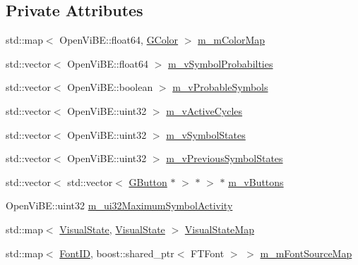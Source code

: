 \subsection*{Private Attributes}
\begin{DoxyCompactItemize}
\item 
std::map$<$ OpenViBE::float64, \hyperlink{structOpenViBEApplications_1_1GColor}{GColor} $>$ \hyperlink{classOpenViBEApplications_1_1P300KeyboardHandler_a6698e3da5de1ca1361ca0051380c70a4}{m\_\-mColorMap}
\item 
std::vector$<$ OpenViBE::float64 $>$ \hyperlink{classOpenViBEApplications_1_1P300KeyboardHandler_a1ac93ed15de2fd151ec5bfaf5e71a607}{m\_\-vSymbolProbabilties}
\item 
std::vector$<$ OpenViBE::boolean $>$ \hyperlink{classOpenViBEApplications_1_1P300KeyboardHandler_ae30854286f16b23de7c72f1549bd5596}{m\_\-vProbableSymbols}
\item 
std::vector$<$ OpenViBE::uint32 $>$ \hyperlink{classOpenViBEApplications_1_1P300KeyboardHandler_ad280c1e2d6f779b4720d8c11b7113aaf}{m\_\-vActiveCycles}
\item 
std::vector$<$ OpenViBE::uint32 $>$ \hyperlink{classOpenViBEApplications_1_1P300KeyboardHandler_a07584e22150a0ab2940cdd7a04a9dc1a}{m\_\-vSymbolStates}
\item 
std::vector$<$ OpenViBE::uint32 $>$ \hyperlink{classOpenViBEApplications_1_1P300KeyboardHandler_a3767646cdb49bf416483f9f9455769fe}{m\_\-vPreviousSymbolStates}
\item 
std::vector$<$ std::vector$<$ \hyperlink{classOpenViBEApplications_1_1GButton}{GButton} $\ast$ $>$ $\ast$ $>$ $\ast$ \hyperlink{classOpenViBEApplications_1_1P300KeyboardHandler_a66266cf621af51049274763bff5f1f15}{m\_\-vButtons}
\item 
OpenViBE::uint32 \hyperlink{classOpenViBEApplications_1_1P300KeyboardHandler_ac82daa9b67e49894444473acf01bc075}{m\_\-ui32MaximumSymbolActivity}
\item 
std::map$<$ \hyperlink{ova__defines_8h_ac2575a0c79ceb4592555fa66f173dfc8}{VisualState}, \hyperlink{ova__defines_8h_ac2575a0c79ceb4592555fa66f173dfc8}{VisualState} $>$ \hyperlink{classOpenViBEApplications_1_1P300KeyboardHandler_a069a6e082d8a9a1d099fbcd7b06a9292}{VisualStateMap}
\item 
std::map$<$ \hyperlink{structOpenViBEApplications_1_1P300KeyboardHandler_1_1FontID}{FontID}, boost::shared\_\-ptr$<$ FTFont $>$ $>$ \hyperlink{classOpenViBEApplications_1_1P300KeyboardHandler_a1a8f42a263a88dd6e6bab7f0ab690b79}{m\_\-mFontSourceMap}
\end{DoxyCompactItemize}


